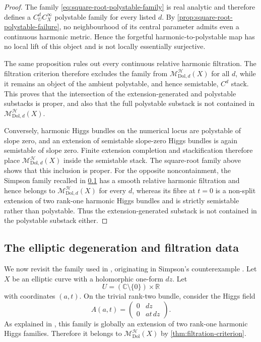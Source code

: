 \documentclass[11pt,reqno]{amsart}
\theoremstyle{definition}
\theoremstyle{remark}
\newcommand{\C}{\mathbb C}
\newcommand{\R}{\mathbb R}
\newcommand{\cH}{\mathcal H}
\newcommand{\Dol}{\mathrm{Dol}}
\newcommand{\MHDol}{\mathscr M^{\cH}_{\Dol}}
\begin{document}
\begin{proof}
The family \eqref{eq:square-root-polystable-family} is real analytic and
therefore defines a $C^d_UC^\infty_X$ polystable family for every listed
$d$.  By \cref{prop:square-root-polystable-failure}, no neighbourhood of
its central parameter admits even a continuous harmonic metric.  Hence
the forgetful harmonic-to-polystable map has no local lift of this
object and is not locally essentially surjective.

The same proposition rules out every continuous relative harmonic
filtration.  The filtration criterion therefore excludes the family
from $\mathscr M_{\Dol,d}^{\cH}(X)$ for all $d$, while it remains an
object of the ambient polystable, and hence semistable, $C^d$ stack.
This proves that the intersection of the extension-generated and
polystable substacks is proper, and also that the full polystable
substack is not contained in $\mathscr M_{\Dol,d}^{\cH}(X)$.

Conversely, harmonic Higgs bundles on the numerical locus are
polystable of slope zero, and an extension of semistable slope-zero
Higgs bundles is again semistable of slope zero.  Finite extension
completion and stackification therefore place
$\mathscr M_{\Dol,d}^{\cH}(X)$ inside the semistable stack.  The
square-root family above shows that this inclusion is proper.  For the
opposite noncontainment, the Simpson family recalled in
\cref{subsec:elliptic-degeneration} has a smooth relative harmonic
filtration and hence belongs to $\mathscr M_{\Dol,d}^{\cH}(X)$ for every
$d$, whereas its fibre at $t=0$ is a non-split extension of two
rank-one harmonic Higgs bundles and is strictly semistable rather than
polystable.  Thus the extension-generated substack is not contained in
the polystable substack either.
\end{proof}

\subsection{The elliptic degeneration and filtration data}\label{subsec:elliptic-degeneration}

We now revisit the family used in \cite{AzamRayan2026}, originating in Simpson's counterexample \cite{Simpson1994}.  Let $X$ be an elliptic curve with a holomorphic one-form $dz$.  Let
\[
  U=(\C\setminus\{0\})\times\R
\]
with coordinates $(a,t)$.  On the trivial rank-two bundle, consider the Higgs field
\begin{equation}\label{eq:Simpson-family-A}
  A(a,t)
  =
  \begin{pmatrix}
    0 & dz\\
    0 & at\,dz
  \end{pmatrix}.
\end{equation}
As explained in \cite{AzamRayan2026}, this family is globally an extension of two rank-one harmonic Higgs families.  Therefore it belongs to $\MHDol(X)$ by \cref{thm:filtration-criterion}.
\end{document}
